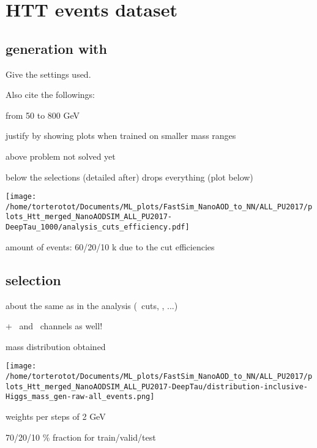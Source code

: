 \section{HTT events dataset}\label{chapter-ML-section-evt_gen}

\subsection{generation with \FASTSIM}

Give the settings used.

Also cite the followings:






from 50 to 800 GeV

justify by showing plots when trained on smaller mass ranges

above problem not solved yet

below the selections (detailed after) drops everything (plot below)

\texttt{[image: /home/torterotot/Documents/ML\_plots/FastSim\_NanoAOD\_to\_NN/ALL\_PU2017/plots\_Htt\_merged\_NanoAODSIM\_ALL\_PU2017-DeepTau\_1000/analysis\_cuts\_efficiency.pdf]}

amount of events: 60/20/10 k due to the cut efficiencies 

\subsection{selection}

about the same as in the analysis (\pT\ cuts, \DEEPTAU, ...)

+ \ele\ele\ and \mu\mu\ channels as well!



mass distribution obtained

\texttt{[image: /home/torterotot/Documents/ML\_plots/FastSim\_NanoAOD\_to\_NN/ALL\_PU2017/plots\_Htt\_merged\_NanoAODSIM\_ALL\_PU2017-DeepTau/distribution-inclusive-Higgs\_mass\_gen-raw-all\_events.png]}

weights per steps of 2 GeV

70/20/10 \% fraction for train/valid/test
